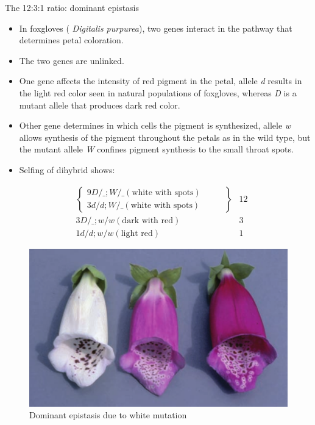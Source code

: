 \documentclass[11pt,dvipsnames,ignorenonframetext,aspectratio=169]{beamer}
\providecommand{\tightlist}{%
  \setlength{\itemsep}{0pt}\setlength{\parskip}{0pt}}
\begin{document}
\begin{frame}{The 12:3:1 ratio: dominant epistasis}
\protect\hypertarget{the-1231-ratio-dominant-epistasis}{}

\begin{itemize}
\tightlist
\item
  In foxgloves ( \emph{Digitalis purpurea}), two genes interact in the
  pathway that determines petal coloration.
\item
  The two genes are unlinked.
\item
  One gene affects the intensity of red pigment in the petal, allele
  \emph{d} results in the light red color seen in natural populations of
  foxgloves, whereas \emph{D} is a mutant allele that produces dark red
  color.
\item
  Other gene determines in which cells the pigment is synthesized,
  allele \emph{w} allows synthesis of the pigment throughout the petals
  as in the wild type, but the mutant allele \emph{W} confines pigment
  synthesis to the small throat spots.
\item
  Selfing of dihybrid shows:
\end{itemize}

\end{frame}

\begin{frame}{}
\protect\hypertarget{section-21}{}

\[
\begin{aligned}
& \left\{
\begin{array}{ll}
9D/\_; W/\_ (\textrm{white with spots}) \hspace{1cm} \\
3 d/d; W/\_ (\textrm{white with spots}) \hspace{1cm}
\end{array}
\right\} & 12 \\
& 3 D/\_; w/w (\textrm{dark with red}) \hspace{1cm} & 3 \\
& 1 d/d; w/w (\textrm{light red}) & 1
\end{aligned}
\]

\end{frame}

\begin{frame}{}
\protect\hypertarget{section-22}{}

\begin{figure}

{\centering \includegraphics[width=0.4\linewidth]{./../images/dominant_epistasis} 

}

\caption{Dominant epistasis due to white mutation}\label{fig:dominant-epistasis}
\end{figure}

\end{frame}
\end{document}
